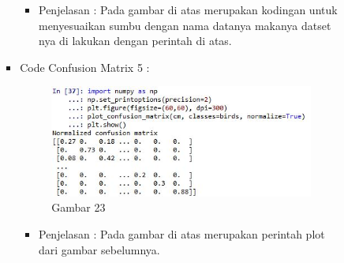 \begin{enumerate}
\begin{itemize}
\begin{itemize}
\begin{itemize}
\par
\begin{itemize}
\item Penjelasan : Pada gambar di atas merupakan kodingan untuk menyesuaikan sumbu dengan nama datanya makanya datset nya di lakukan dengan perintah di atas.
\par
\par
\par
\end{itemize}
\item Code Confusion Matrix 5 :
\par
\begin{figure}[ht]
\centering
\includegraphics[scale=0.7]{figures/cod23.jpeg}
\caption{Gambar 23}
\label{contoh}
\end{figure}
\par
\begin{itemize}
\item Penjelasan : Pada gambar di atas merupakan perintah plot dari gambar sebelumnya.
\par
\par
\par
\end{itemize}

\end{itemize}


\end{itemize}
\end{itemize}
\end{enumerate}
